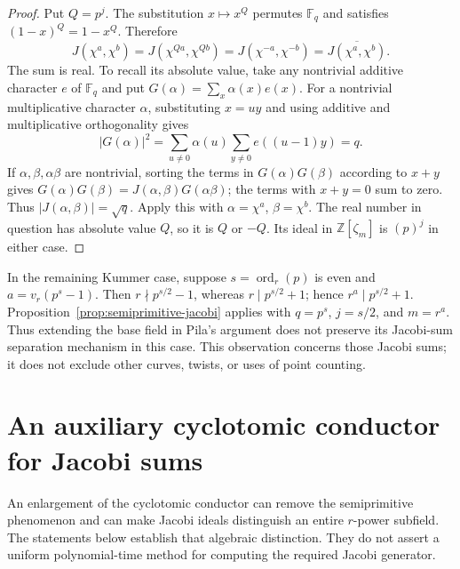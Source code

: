 \documentclass[11pt]{article}
\theoremstyle{definition}
\theoremstyle{remark}
\begin{document}
\begin{proof}
Put $Q=p^j$.  The substitution $x\mapsto x^Q$ permutes
$\mathbb F_q$ and satisfies $(1-x)^Q=1-x^Q$.  Therefore
\[
 J(\chi^a,\chi^b)=J(\chi^{Qa},\chi^{Qb})
   =J(\chi^{-a},\chi^{-b})
   =\overline{J(\chi^a,\chi^b)}.
\]
The sum is real.  To recall its absolute value, take any nontrivial
additive character $e$ of $\mathbb F_q$ and put
$G(\alpha)=\sum_x\alpha(x)e(x)$.
For a nontrivial multiplicative character $\alpha$, substituting
$x=uy$ and using additive and multiplicative orthogonality gives
\[
 |G(\alpha)|^2
 =\sum_{u\ne0}\alpha(u)\sum_{y\ne0}e((u-1)y)=q.
\]
If $\alpha,\beta,\alpha\beta$ are nontrivial, sorting the
terms in $G(\alpha)G(\beta)$ according to $x+y$ gives
$G(\alpha)G(\beta)=J(\alpha,\beta)G(\alpha\beta)$;
the terms with $x+y=0$ sum to zero.
Thus $|J(\alpha,\beta)|=\sqrt q$.
Apply this with $\alpha=\chi^a$, $\beta=\chi^b$.
The real number in question has absolute value $Q$, so it is
$Q$ or $-Q$.  Its ideal in $\mathbb Z[\zeta_m]$ is
$(p)^j$ in either case.
\end{proof}

In the remaining Kummer case, suppose $s=\operatorname{ord}_r(p)$
is even and $a=v_r(p^s-1)$.
Then $r\nmid p^{s/2}-1$, whereas $r\mid p^{s/2}+1$;
hence $r^a\mid p^{s/2}+1$.
Proposition~\ref{prop:semiprimitive-jacobi} applies with
$q=p^s$, $j=s/2$, and $m=r^a$.
Thus extending the base field in Pila's argument does not preserve
its Jacobi-sum separation mechanism in this case.
This observation concerns those Jacobi sums; it does not exclude
other curves, twists, or uses of point counting.

\section{An auxiliary cyclotomic conductor for Jacobi sums}
\label{sec:auxiliary-cm-conductor}

An enlargement of the cyclotomic conductor can remove the
semiprimitive phenomenon and can make Jacobi ideals distinguish
an entire \(r\)-power subfield. The statements below establish
that algebraic distinction. They do not assert a uniform
polynomial-time method for computing the required Jacobi generator.
\end{document}
